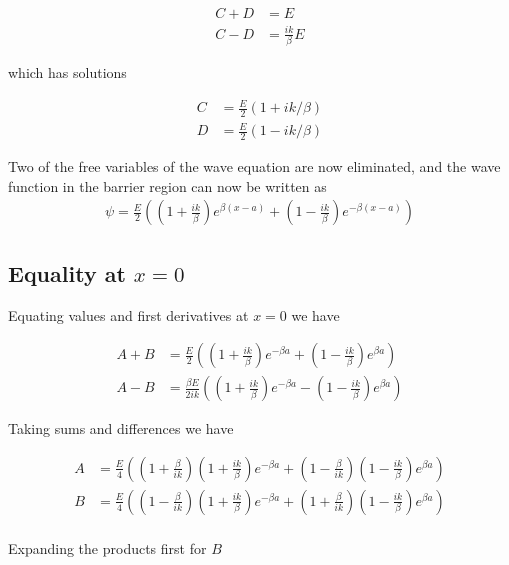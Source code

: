 \documentclass{article}
\begin{document}
\begin{align*}
C + D &= E \\
C - D &= \frac{i k}{\beta}E
\end{align*}

which has solutions

\begin{align*}
C &= \frac{E}{2}( 1 + i k/\beta ) \\
D &= \frac{E}{2}( 1 - i k/\beta )
\end{align*}

Two of the free variables of the wave equation are now eliminated, and the wave function in the barrier region can now be written as
\begin{align}\label{eqn:psiInBarrier}
\psi =
\frac{E}{2}\left( \left( 1 + \frac{i k}{\beta} \right) e^{ \beta(x-a)} + \left( 1 - \frac{i k}{\beta} \right) e^{ -\beta(x-a)} \right)
\end{align}

\subsection{ Equality at $x=0$ }

Equating values and first derivatives at $x=0$ we have

\begin{align*}
A + B &=
\frac{E}{2}\left( \left( 1 + \frac{i k}{\beta} \right) e^{ -\beta a} + \left( 1 - \frac{i k}{\beta} \right) e^{ \beta a } \right) \\
A - B &=
\frac{\beta E}{2 i k}\left( \left( 1 + \frac{i k}{\beta} \right) e^{ -\beta a} - \left( 1 - \frac{i k}{\beta} \right) e^{ \beta a } \right)
\end{align*}

Taking sums and differences we have

\begin{align*}
A &= \frac{E}{4}\left( \left(1 + \frac{\beta}{ik}\right)\left( 1 + \frac{i k}{\beta} \right) e^{ -\beta a} + \left(1 - \frac{\beta}{ik}\right)\left( 1 - \frac{i k}{\beta} \right) e^{ \beta a } \right) \\
B &= \frac{E}{4}\left( \left(1 - \frac{\beta}{ik}\right)\left( 1 + \frac{i k}{\beta} \right) e^{ -\beta a} + \left(1 + \frac{\beta}{ik}\right)\left( 1 - \frac{i k}{\beta} \right) e^{ \beta a } \right) \\
\end{align*}

Expanding the products first for $B$
\end{document}
